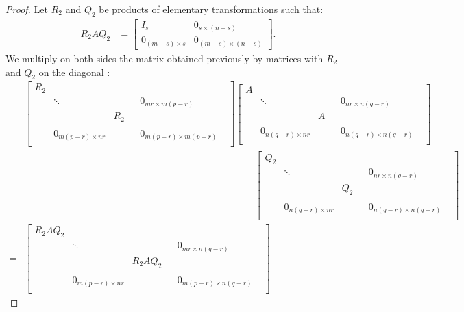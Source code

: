 \documentclass[11pt]{article}
\begin{document}
\begin{proof}
Let $R_2$ and $Q_2$ be products of elementary transformations such that:
\begin{align*}
    R_2AQ_2 &=\begin{bmatrix}
    I_s & 0_{s\times(n-s)}\\
    0_{(m-s)\times s} & 0_{(m-s)\times (n-s)}
    \end{bmatrix}.
\end{align*}
We multiply on both sides the matrix obtained previously by matrices with $R_2$ and $Q_2$ on the diagonal :
\begin{align*}
    &\begin{bmatrix}
    R_2 & & & & &\\
    & \ddots & & & 0_{mr \times m(p-r)} &\\
    & & R_2 & & & \\
    & & & & &\\
    & 0_{m(p-r) \times nr} & & & 0_{m(p-r) \times m(p-r)} &\\
    & & & & &
    \end{bmatrix}
    \begin{bmatrix}
    A & & & & &\\
    & \ddots & & & 0_{nr \times n(q-r)} &\\
    & & A & & & \\
    & & & & &\\
    & 0_{n(q-r) \times nr} & & & 0_{n(q-r) \times n(q-r)} &\\
    & & & & &
    \end{bmatrix}\\
    &\qquad\qquad\qquad\qquad\qquad\qquad\qquad\qquad\qquad\qquad\qquad\qquad
    \begin{bmatrix}
    Q_2 & & & & &\\
    & \ddots & & & 0_{nr \times n(q-r)} &\\
    & & Q_2 & & & \\
    & & & & &\\
    & 0_{n(q-r) \times nr} & & & 0_{n(q-r) \times n(q-r)} &\\
    & & & & &
    \end{bmatrix}\\
    = &\begin{bmatrix}
    R_2AQ_2 & & & & &\\
    & \ddots & & & 0_{mr \times n(q-r)} &\\
    & & R_2AQ_2 & & & \\
    & & & & &\\
    & 0_{m(p-r) \times nr} & & & 0_{m(p-r) \times n(q-r)} &\\

\end{bmatrix}
\end{align*}
\end{proof}
\end{document}
